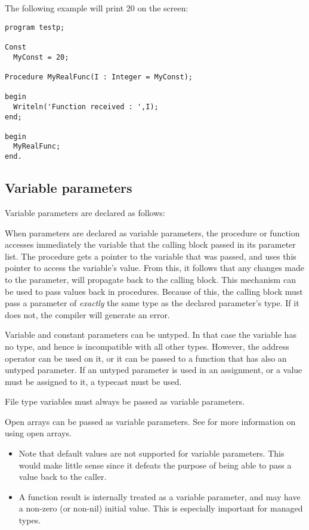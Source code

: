 The following example will print 20 on the screen:
\begin{verbatim}
program testp;

Const
  MyConst = 20;

Procedure MyRealFunc(I : Integer = MyConst);

begin
  Writeln('Function received : ',I);
end;  
  
begin
  MyRealFunc;
end.    
\end{verbatim}

\subsection{Variable parameters}
\label{se:varparams}
Variable parameters are declared as follows:

When parameters are declared as variable parameters, the procedure or
function accesses immediately the variable that the calling block passed in
its parameter list. The procedure gets a pointer to the variable that was
passed, and uses this pointer to access the variable's value.
From this, it follows that any changes made to the parameter, will
propagate back to the calling block. This mechanism can be used to pass
values back in procedures.
Because of this, the calling block must pass a parameter of {\em exactly}
the same type as the declared parameter's type. If it does not, the compiler
will generate an error.

Variable and constant parameters can be untyped. In that case the variable has no type,
and hence is incompatible with all other types. However, the address operator
can be used on it, or it can be passed to a function that has also an
untyped parameter. If an untyped parameter is used in an assignment,
or a value must be assigned to it, a typecast must be used.

File type variables must always be passed as variable parameters.

Open arrays can be passed as variable parameters. See  for
more information on using open arrays.

\begin{remark}
\begin{itemize}
\item Note that default values are not supported for variable parameters. This
would make little sense since it defeats the purpose of being able to pass a
value back to the caller.
\item A function result is internally treated as a variable parameter, and
may have a non-zero (or non-nil) initial value. This is especially important
for managed types.
\end{itemize}
\end{remark}



